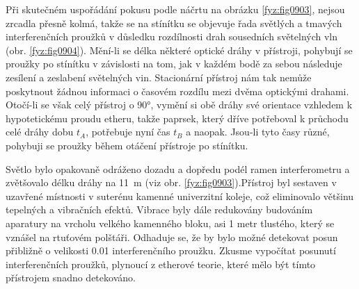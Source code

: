 \begin{mdframed}[style=mdexam]
  \begin{example}\label{fyz:fey_exam016}
    Při skutečném uspořádání pokusu podle náčrtu na obrázku \ref{fyz:fig0903}, nejsou zrcadla přesně
    kolmá, takže se na stínítku se objevuje řada světlých a tmavých interferenčních proužků v
    důsledku rozdílnosti drah sousedních světelných vln (obr. \ref{fyz:fig0904}). Mění-li se délka
    některé optické dráhy v přístroji, pohybují se proužky po stínítku v závislosti na tom, jak v
    každém bodě za sebou následuje zesílení a zeslabení světelných vin. Stacionární přístroj nám tak
    nemůže poskytnout žádnou informaci o časovém rozdílu mezi dvěma optickými drahami. Otočí-li se
    však celý přístroj o \ang{90}, vymění si obě dráhy své orientace vzhledem k hypotetickému proudu
    etheru, takže paprsek, který dříve potřeboval k průchodu celé dráhy dobu \(t_A\), potřebuje nyní
    čas \(t_B\) a naopak. Jsou-li tyto časy různé, pohybuji se proužky během otáčení přístroje po
    stínítku. \newline

    {\centering
    \captionsetup{type=figure}
    \par}
    \vspace{1em}

    Světlo bylo opakovaně odráženo dozadu a dopředu podél ramen interferometru a zvětšovalo délku
    dráhy na \SI{11}{\metre} (viz obr. \ref{fyz:fig0903}).Přístroj byl sestaven v uzavřené místnosti
    v suterénu kamenné univerzitní koleje, což eliminovalo většinu tepelných a vibračních efektů.
    Vibrace byly dále redukovány budováním aparatury na vrcholu velkého kamenného bloku, asi 1 metr
    tlustého, který se vznášel na rtuťovém polštáři. Odhaduje se, že by bylo možné detekovat posun
    přibližně o velikosti \num{0.01} interferenčního proužku. Zkusme vypočítat posunutí
    interferenčních proužků, plynoucí z etherové teorie, které mělo být tímto přístrojem snadno
    detekováno. 

    {\centering
    \captionsetup{type=figure}
    \par}
    \vspace{1em}


\end{example}
\end{mdframed}
